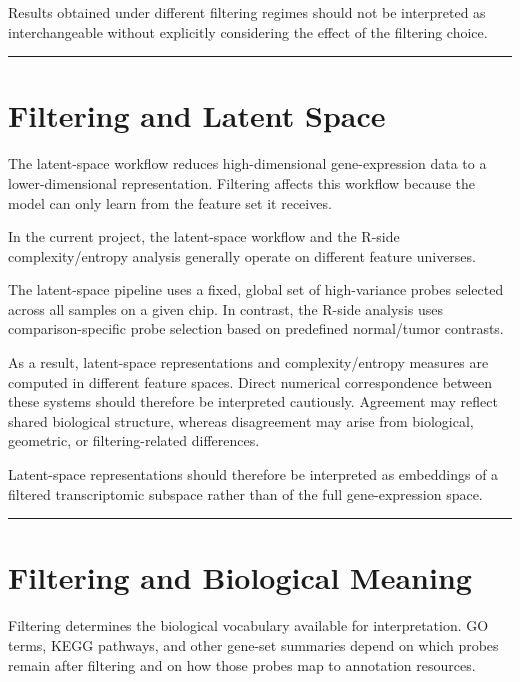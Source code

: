 \documentclass[
  letterpaper,
  DIV=11,
  numbers=noendperiod,
  openany,
  oneside]{scrreprt}
\begin{document}
Results obtained under different filtering regimes should not be
interpreted as interchangeable without explicitly considering the effect
of the filtering choice.

\begin{center}\rule{0.5\linewidth}{0.5pt}\end{center}

\section{Filtering and Latent Space}\label{filtering-and-latent-space}

The latent-space workflow reduces high-dimensional gene-expression data
to a lower-dimensional representation. Filtering affects this workflow
because the model can only learn from the feature set it receives.

In the current project, the latent-space workflow and the R-side
complexity/entropy analysis generally operate on different feature
universes.

The latent-space pipeline uses a fixed, global set of high-variance
probes selected across all samples on a given chip. In contrast, the
R-side analysis uses comparison-specific probe selection based on
predefined normal/tumor contrasts.

As a result, latent-space representations and complexity/entropy
measures are computed in different feature spaces. Direct numerical
correspondence between these systems should therefore be interpreted
cautiously. Agreement may reflect shared biological structure, whereas
disagreement may arise from biological, geometric, or filtering-related
differences.

Latent-space representations should therefore be interpreted as
embeddings of a filtered transcriptomic subspace rather than of the full
gene-expression space.

\begin{center}\rule{0.5\linewidth}{0.5pt}\end{center}

\section{Filtering and Biological
Meaning}\label{filtering-and-biological-meaning}

Filtering determines the biological vocabulary available for
interpretation. GO terms, KEGG pathways, and other gene-set summaries
depend on which probes remain after filtering and on how those probes
map to annotation resources.
\end{document}
